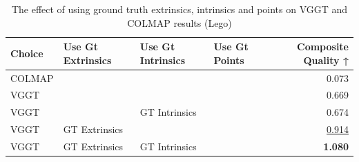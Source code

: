 \begin{table}[H]
\caption{The effect of using ground truth extrinsics, intrinsics and points on VGGT and COLMAP results (Lego)}
\label{tab:06_gt_cams_lego}
\begin{tabular}{llllr}
\toprule
Choice & Use Gt Extrinsics & Use Gt Intrinsics & Use Gt Points & Composite Quality ↑ \\
\midrule
COLMAP &  &  &  & 0.073 \\
VGGT &  &  &  & 0.669 \\
VGGT &  & GT Intrinsics &  & 0.674 \\
VGGT & GT Extrinsics &  &  & \underline{0.914} \\
VGGT & GT Extrinsics & GT Intrinsics &  & \textbf{1.080} \\
\bottomrule
\end{tabular}
\end{table}
